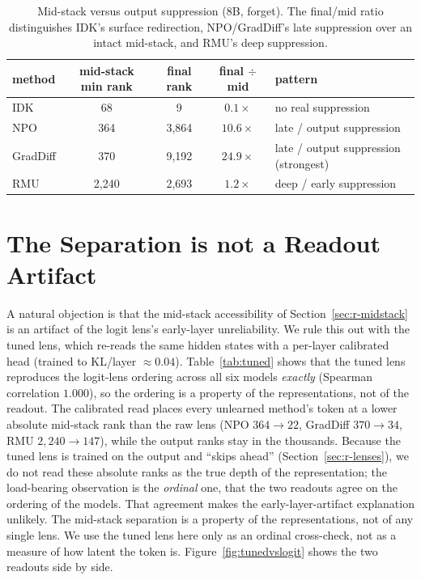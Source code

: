\begin{table}[t]
  \centering
  \caption[Mid-stack versus output suppression]{Mid-stack versus output suppression (8B, forget). The final/mid ratio distinguishes IDK's
  surface redirection, NPO/GradDiff's late suppression over an intact mid-stack, and RMU's deep
  suppression.}
  \label{tab:midstack}
  \begin{tabular}{lcccl}
    \toprule
    method & mid-stack min rank & final rank & final $\div$ mid & pattern \\
    \midrule
    IDK      & 68    & 9     & $0.1\times$  & no real suppression \\
    NPO      & 364   & 3{,}864 & $10.6\times$ & late / output suppression \\
    GradDiff & 370   & 9{,}192 & $24.9\times$ & late / output suppression (strongest) \\
    RMU      & 2{,}240 & 2{,}693 & $1.2\times$  & deep / early suppression \\
    \bottomrule
  \end{tabular}
\end{table}

\section{The Separation is not a Readout Artifact}
\label{sec:r-tuned}

A natural objection is that the mid-stack accessibility of Section~\ref{sec:r-midstack} is an artifact of
the logit lens's early-layer unreliability. We rule this out with the tuned lens, which re-reads the same
hidden states with a per-layer calibrated head (trained to KL/layer $\approx 0.04$).
Table~\ref{tab:tuned} shows that the tuned lens reproduces the logit-lens ordering across all six models
\emph{exactly} (Spearman correlation $1.000$), so the ordering is a property of the representations, not of
the readout. The calibrated read places every unlearned method's token at a lower absolute mid-stack rank
than the raw lens (NPO $364 \to 22$, GradDiff $370 \to 34$, RMU $2{,}240 \to 147$), while the output ranks
stay in the thousands. Because the tuned lens is trained on the output and ``skips ahead''
(Section~\ref{sec:r-lenses}), we do not read these absolute ranks as the true depth of the representation;
the load-bearing observation is the \emph{ordinal} one, that the two readouts agree on the ordering of the
models. That agreement makes the early-layer-artifact explanation unlikely. The mid-stack separation is a
property of the representations, not of any single lens. We use the tuned lens here only as an ordinal
cross-check, not as a measure of how latent the token is. Figure~\ref{fig:tunedvslogit} shows the two
readouts side by side.

